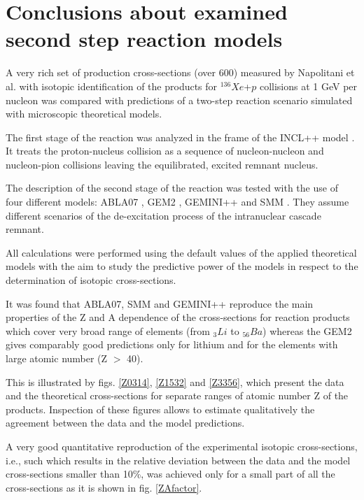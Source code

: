 \section{Conclusions about examined second step reaction models}

A very rich set of production cross-sections (over 600) 
measured by Napolitani et al. \cite{napolitani2007measurement} with
isotopic identification of the products for $^{136}Xe$+$p$ collisions
at 1 GeV per nucleon was compared with predictions 
of a two-step reaction scenario simulated with  microscopic theoretical models. 

The first stage of
the reaction was analyzed in the frame of the INCL++
model \cite{INCLboudard2013new}. It treats the proton-nucleus collision as a
sequence of nucleon-nucleon and nucleon-pion collisions
leaving the equilibrated, excited remnant nucleus. 

The description of the second
stage of the reaction was tested with the use 
of four different models: ABLA07  \cite{kelic2009abla07}, GEM2  \cite{FURIHATA2000,Furihata2002}, GEMINI++ \cite{CHARITY1988,Charity2010} 
and SMM \cite{SMMBondorf1995}. They assume different scenarios of the
de-excitation process of the intranuclear 
cascade remnant.

All calculations were performed using the default values
of the applied theoretical models with the aim to study
the predictive power of the models in respect to the determination
of isotopic cross-sections.

It was found that ABLA07, SMM and GEMINI++ reproduce
the main properties of the Z and A dependence of the cross-sections for reaction products which cover very
broad range of elements (from $_{3}Li$ to $_{56}Ba$) whereas the
GEM2 gives comparably good predictions only for lithium
and for the elements with large atomic number (Z $>$ 40).

This is illustrated by figs. \ref{Z0314}, \ref{Z1532} and \ref{Z3356}, which present the data and
the theoretical cross-sections for separate ranges of atomic
number Z of the products. Inspection of these figures allows
to estimate qualitatively the agreement between the 
data and the model predictions.

A very good quantitative reproduction of the experimental
isotopic cross-sections, i.e., such which results in
the relative deviation between the data and the model
cross-sections smaller than 10\%, was achieved only for a
small part of all the cross-sections as it is shown in fig. \ref{ZAfactor}.

